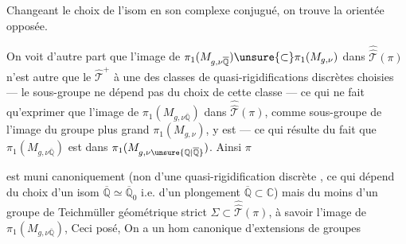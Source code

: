

Changeant le choix de l'isom en son complexe conjugué, on trouve la   orientée opposée.

On voit d'autre part que l'image de $\pi_1(M_{g,\nu\overline{\mathbb Q}})\unsure{\subset}\pi_1(M_{g,\nu})$ dans $\widehat{\widehat{\mathcal T}}(\pi)$ n'est autre que le $\widehat{\mathcal T}^{+}$  à une  des classes de quasi-rigidifications discrètes choisies --- le sous-groupe ne dépend pas du choix de cette classe --- ce qui ne fait qu'exprimer que l'image de $\pi_1(M_{g,\nu\overline{\mathbb Q}})$ dans $\widehat{\widehat{\mathcal T}}(\pi)$,  comme sous-groupe de l'image du groupe plus grand $\pi_1(M_{g,\nu})$, y est  --- ce qui résulte du fait que $\pi_1(M_{g,\nu\overline{\mathbb Q}})$ est  dans $\pi_1(M_{g,\nu\unsure{\mathbb Q|\overline{\mathbb Q}}})$. Ainsi $\pi$


est muni canoniquement (non d'une quasi-rigidification discrète , ce qui dépend du choix d'un isom $\overline{\mathbb Q}\simeq\overline{\mathbb Q}_0$ i.e. d'un plongement $\overline{\mathbb Q}\subset\mathbb C$) mais du moins d'un groupe de Teichmüller géométrique strict $\Sigma\subset\widehat{\widehat{\mathcal T}}(\pi)$, à savoir l'image de $\pi_1(M_{g,\nu\overline{\mathbb Q}})$,  Ceci posé, On a un hom canonique d'extensions de groupes



